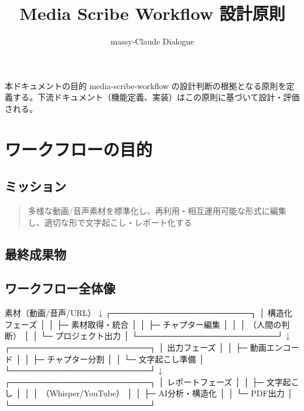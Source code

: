 \documentclass[10pt,a4paper,twocolumn]{ltjsarticle}
\title{\textsf{\textbf{Media Scribe Workflow 設計原則}}}
\author{massy-Claude Dialogue}
\date{}
\begin{document}
\thispagestyle{firstpage}
\maketitle

\begin{itembox}[l]{本ドキュメントの目的}
media-scribe-workflow の設計判断の根拠となる原則を定義する。下流ドキュメント（機能定義、実装）はこの原則に基づいて設計・評価される。
\end{itembox}

\section{ワークフローの目的}

\subsection{ミッション}

\begin{quote}
多様な動画/音声素材を標準化し、再利用・相互運用可能な形式に編集し、適切な形で文字起こし・レポート化する
\end{quote}

\subsection{最終成果物}

\vspace{0.5\baselineskip}
\vspace{0.5\baselineskip}

\subsection{ワークフロー全体像}

\begin{code}
素材（動画/音声/URL）
    ↓
┌────────────────────────┐
│ 構造化フェーズ          │
│ ├─ 素材取得・統合       │
│ ├─ チャプター編集       │
│ │   （人間の判断）      │
│ └─ プロジェクト出力     │
└────────────────────────┘
    ↓
┌────────────────────────┐
│ 出力フェーズ            │
│ ├─ 動画エンコード       │
│ ├─ チャプター分割       │
│ └─ 文字起こし準備       │
└────────────────────────┘
    ↓
┌────────────────────────┐
│ レポートフェーズ        │
│ ├─ 文字起こし           │
│ │  （Whisper/YouTube）  │
│ ├─ AI分析・構造化       │
│ └─ PDF出力              │
└────────────────────────┘
\end{code}
\end{document}
